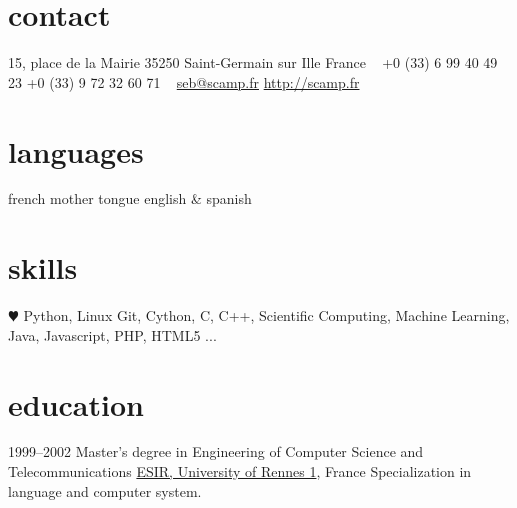 \documentclass[]{friggeri-cv} %
\begin{document}


\begin{aside} %
\section{contact}
15, place de la Mairie
35250 Saint-Germain sur Ille
France
~
+0 (33) 6 99 40 49 23
+0 (33) 9 72 32 60 71
~
\href{mailto:sebastien.campion@gmail.com}{seb@scamp.fr}
\href{http://scamp.fr}{http://scamp.fr}
\section{languages}
french mother tongue
english \& spanish %
\section{skills}
{\color{red} $\varheartsuit$} Python, %
Linux
Git, Cython, C, C++, Scientific Computing, Machine Learning, Java, Javascript, PHP, HTML5
...
\end{aside}


\section{education}

\begin{entrylist}
\entry
{1999--2002}
{Master's degree in Engineering {\normalfont of Computer Science and Telecommunications}}
{\href{https://esir.univ-rennes1.fr}{ESIR, University of Rennes 1}, France}
{Specialization in language and computer system.}
\end{entrylist}
\end{document}
